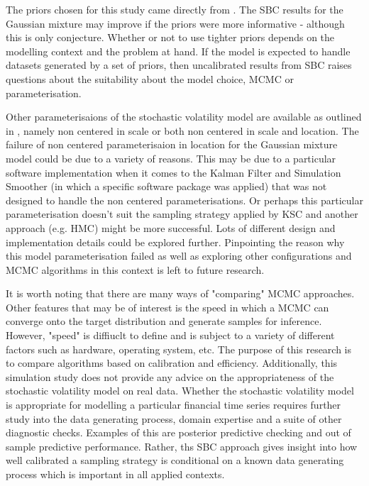 \documentclass[12pt, a4paper]{article}
\begin{document}
The priors chosen for this study came directly from \citet{kim1998stochastic}. The SBC results for the Gaussian mixture may improve if the priors were more informative - although this is only conjecture. Whether or not to use tighter priors depends on the modelling context and the problem at hand. If the model is expected to handle datasets generated by a set of priors, then uncalibrated results from SBC raises questions about the suitability about the model choice, MCMC or parameterisation. 

Other parameterisaions of the stochastic volatility model are available as outlined in \citet{strickland2008parameterisation}, namely non centered in scale or both non centered in scale and location. The failure of non centered parameterisaion in location for the Gaussian mixture model could be due to a variety of reasons. This may be due to a particular software implementation when it comes to the Kalman Filter and Simulation Smoother (in which a specific software package was applied) that was not designed to handle the non centered parameterisations. Or perhaps this particular parameterisation doesn't suit the sampling strategy applied by KSC and another approach (e.g. HMC) might be more successful. Lots of different design and implementation details could be explored further. Pinpointing the reason why this model parameterisation failed as well as exploring other configurations and MCMC algorithms in this context is left to future research.

It is worth noting that there are many ways of "comparing" MCMC approaches. Other features that may be of interest is the speed in which a MCMC can converge onto the target distribution and generate samples for inference. However, "speed" is diffiuclt to define and is subject to a variety of different factors such as hardware, operating system, etc. The purpose of this research is to compare algorithms based on calibration and efficiency. Additionally, this simulation study does not provide any advice on the appropriateness of the stochastic volatility model on real data. Whether the stochastic volatility model is appropriate for modelling a particular financial time series requires further study into the data generating process, domain expertise and a suite of other diagnostic checks. Examples of this are posterior predictive checking and out of sample predictive performance. Rather, ths SBC approach gives insight into how well calibrated a sampling strategy is conditional on a known data generating process which is important in all applied contexts.  
\end{document}
